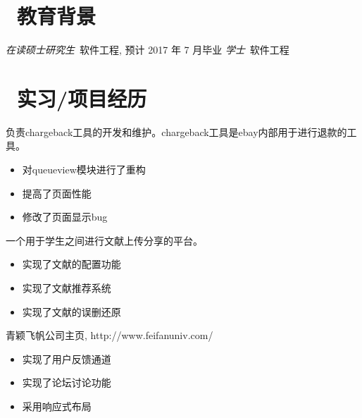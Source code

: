 \documentclass{resume}
\begin{document}



\section{\faGraduationCap\  教育背景}
\textit{在读硕士研究生}\ 软件工程, 预计 2017 年 7 月毕业
\textit{学士}\ 软件工程

\section{\faUsers\ 实习/项目经历}
\role{实习}{软件开发}
负责chargeback工具的开发和维护。chargeback工具是ebay内部用于进行退款的工具。
\begin{itemize}
  \item 对queueview模块进行了重构
  \item 提高了页面性能
  \item 修改了页面显示bug
\end{itemize}

\begin{onehalfspacing}
一个用于学生之间进行文献上传分享的平台。
\begin{itemize}
  \item 实现了文献的配置功能
  \item 实现了文献推荐系统
  \item 实现了文献的误删还原
\end{itemize}
\end{onehalfspacing}

\begin{onehalfspacing}
青颖飞帆公司主页, http://www.feifanuniv.com/
\begin{itemize}
  \item 实现了用户反馈通道
  \item 实现了论坛讨论功能
  \item 采用响应式布局
\end{itemize}
\end{onehalfspacing}
\end{document}
